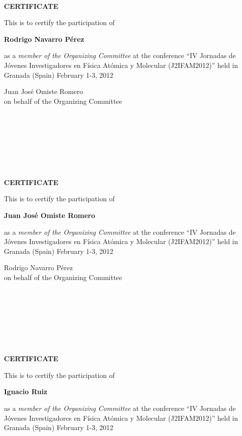\documentclass [13pt,a4paper] {letter}
\begin{document}
\begin{verbatim}







\end{verbatim}
\pagestyle{empty}
\begin{center}
{\bf {\Huge CERTIFICATE}}

\vspace {1.5cm}
This is to certify the participation of
\vspace {1cm}

{\bf \Large  Rodrigo    Navarro Pérez }
\vspace {1cm}

as a \emph{member of the Organizing Committee} at the conference { \textquotedblleft IV Jornadas de Jóvenes Investigadores en Física Atómica y Molecular (J2IFAM2012)\textquotedblright} 
held in Granada (Spain) February 1-3, 2012
\end{center}
\vspace {4cm}
\begin{raggedleft}
Juan José Omiste Romero\\
on behalf of the Organizing Committee
\newpage
\end{raggedleft}
\begin{verbatim}







\end{verbatim}
\pagestyle{empty}
\begin{center}
{\bf {\Huge CERTIFICATE}}

\vspace {1.5cm}
This is to certify the participation of
\vspace {1cm}

{\bf \Large  Juan   José  Omiste Romero }
\vspace {1cm}

as a \emph{member of the Organizing Committee} at the conference { \textquotedblleft IV Jornadas de Jóvenes Investigadores en Física Atómica y Molecular (J2IFAM2012)\textquotedblright} 
held in Granada (Spain) February 1-3, 2012
\end{center}
\vspace {4cm}
\begin{raggedleft}
Rodrigo Navarro Pérez\\
on behalf of the Organizing Committee
\newpage
\end{raggedleft}
\begin{verbatim}







\end{verbatim}
\pagestyle{empty}
\begin{center}
{\bf {\Huge CERTIFICATE}}

\vspace {1.5cm}
This is to certify the participation of
\vspace {1cm}

{\bf \Large  Ignacio    Ruiz }
\vspace {1cm}

as a \emph{member of the Organizing Committee} at the conference { \textquotedblleft IV Jornadas de Jóvenes Investigadores en Física Atómica y Molecular (J2IFAM2012)\textquotedblright} 
held in Granada (Spain) February 1-3, 2012
\end{center}
\end{document}
